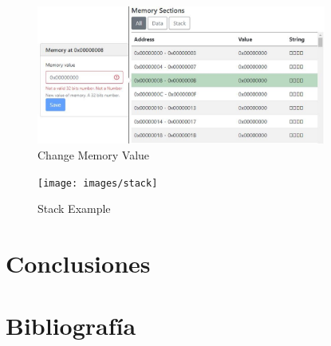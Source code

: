 {{            \begin{figure}[h]
                \centering
                \includegraphics[width=0.85\textwidth]{images/modifymemory}
                \caption{Change Memory Value}
            \end{figure}

            \begin{figure}[h]
                \centering
                \texttt{[image: images/stack]}
                \caption{Stack Example}
            \end{figure}            
        }
    }

\section{Conclusiones}
\section{Bibliografía}


